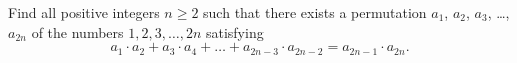 Find all positive integers $n\geqslant 2$ such that there exists a permutation $a_1$, $a_2$, $a_3$, \ldots, $a_{2n}$ of the numbers  $1, 2, 3, \ldots, 2n$ satisfying $$a_1\cdot a_2 + a_3\cdot a_4 + \ldots + a_{2n-3} \cdot  a_{2n-2} = a_{2n-1} \cdot a_{2n}.$$